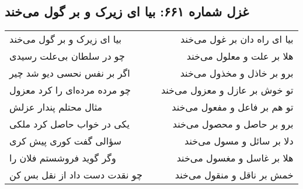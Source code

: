 \begin{center}
\section*{غزل شماره ۶۶۱: بیا ای زیرک و بر گول می‌خند}
\label{sec:0661}
\begin{longtable}{l p{0.5cm} r}
بیا ای زیرک و بر گول می‌خند
&&
بیا ای راه دان بر غول می‌خند
\\
چو در سلطان بی‌علت رسیدی
&&
هلا بر علت و معلول می‌خند
\\
اگر بر نفس نحسی دیو شد چیر
&&
برو بر خاذل و مخذول می‌خند
\\
چو مرده مرده‌ای را کرد معزول
&&
تو خوش بر عازل و معزول می‌خند
\\
مثال محتلم پندار عزلش
&&
تو هم بر فاعل و مفعول می‌خند
\\
یکی در خواب حاصل کرد ملکی
&&
برو بر حاصل و محصول می‌خند
\\
سؤالی گفت کوری پیش کری
&&
دلا بر سائل و مسول می‌خند
\\
وگر گوید فروشستم فلان را
&&
هلا بر غاسل و مغسول می‌خند
\\
چو نقدت دست داد از نقل بس کن
&&
خمش بر ناقل و منقول می‌خند
\\
\end{longtable}
\end{center}
